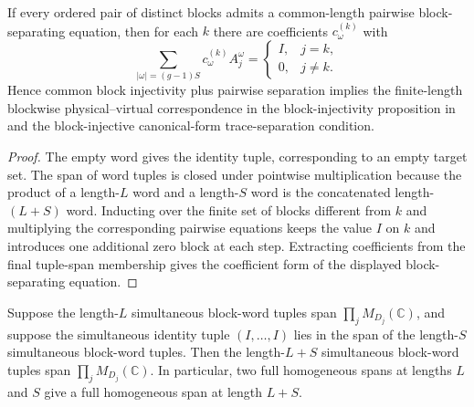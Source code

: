 \begin{lemma}
    \label{lem:block_separating_equations_from_pairwise_separation}
    \leanok
    If every ordered pair of distinct blocks admits a common-length pairwise
    block-separating equation, then for each $k$ there are coefficients
    $c_\omega^{(k)}$ with
    \[
        \sum_{|\omega|=(g-1)S} c_\omega^{(k)} A_j^\omega
        =
        \begin{cases}
            I, & j=k,    \\
            0, & j\ne k.
        \end{cases}
    \]
    Hence common block injectivity plus pairwise separation implies the
    finite-length blockwise physical--virtual correspondence in the
    block-injectivity proposition in \cite[lines~340--345]{Cirac2016MPDO_arXiv}
    and the block-injective canonical-form trace-separation condition.
\end{lemma}

\begin{proof}
    \leanok
    The empty word gives the identity tuple, corresponding to an empty target set.
    The span of word tuples is closed under pointwise multiplication because the
    product of a length-$L$ word and a length-$S$ word is the concatenated
    length-$(L+S)$ word. Inducting over the finite set of blocks different from
    $k$ and multiplying the corresponding pairwise equations keeps the value $I$
    on $k$ and introduces one additional zero block at each step. Extracting
    coefficients from the final tuple-span membership gives the coefficient form
    of the displayed block-separating equation.
\end{proof}

\begin{lemma}
    \label{lem:homogeneous_word_tuple_span_padding}
    \leanok
    Suppose the length-\(L\) simultaneous block-word tuples span
    \(\prod_j M_{D_j}(\mathbb C)\), and suppose the simultaneous identity tuple
    \((I,\ldots,I)\) lies in the span of the length-\(S\) simultaneous
    block-word tuples. Then the length-\(L+S\) simultaneous block-word tuples
    span \(\prod_j M_{D_j}(\mathbb C)\). In particular, two full homogeneous
    spans at lengths \(L\) and \(S\) give a full homogeneous span at length
    \(L+S\).
\end{lemma}


